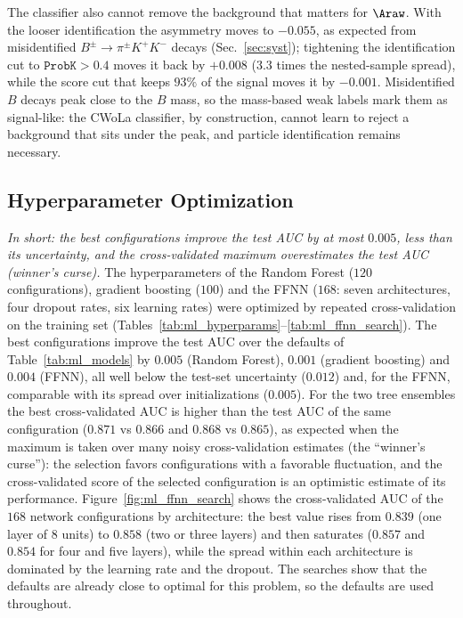 The classifier also cannot remove the background that matters for $\Araw$. With the looser identification the asymmetry moves to $-0.055$, as expected from misidentified $B^\pm\to\pi^\pm K^+K^-$ decays (Sec.~\ref{sec:syst}); tightening the identification cut to $\texttt{ProbK}>0.4$ moves it back by $+0.008$ ($3.3$ times the nested-sample spread), while the score cut that keeps $93\%$ of the signal moves it by $-0.001$. Misidentified $B$ decays peak close to the $B$ mass, so the mass-based weak labels mark them as signal-like: the CWoLa classifier, by construction, cannot learn to reject a background that sits under the peak, and particle identification remains necessary.



\subsection{Hyperparameter Optimization}
\label{sec:ml_hyper}
\emph{In short: the best configurations improve the test AUC by at most $0.005$, less than its uncertainty, and the cross-validated maximum overestimates the test AUC (winner's curse).}
The hyperparameters of the Random Forest ($120$ configurations), gradient boosting ($100$) and the FFNN ($168$: seven architectures, four dropout rates, six learning rates) were optimized by repeated cross-validation on the training set (Tables~\ref{tab:ml_hyperparams}--\ref{tab:ml_ffnn_search}). The best configurations improve the test AUC over the defaults of Table~\ref{tab:ml_models} by $0.005$ (Random Forest), $0.001$ (gradient boosting) and $0.004$ (FFNN), all well below the test-set uncertainty ($0.012$) and, for the FFNN, comparable with its spread over initializations ($0.005$). For the two tree ensembles the best cross-validated AUC is higher than the test AUC of the same configuration ($0.871$ vs $0.866$ and $0.868$ vs $0.865$), as expected when the maximum is taken over many noisy cross-validation estimates (the ``winner's curse''): the selection favors configurations with a favorable fluctuation, and the cross-validated score of the selected configuration is an optimistic estimate of its performance. Figure~\ref{fig:ml_ffnn_search} shows the cross-validated AUC of the $168$ network configurations by architecture: the best value rises from $0.839$ (one layer of $8$ units) to $0.858$ (two or three layers) and then saturates ($0.857$ and $0.854$ for four and five layers), while the spread within each architecture is dominated by the learning rate and the dropout. The searches show that the defaults are already close to optimal for this problem, so the defaults are used throughout.


